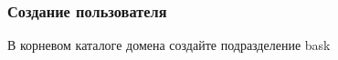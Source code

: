 \documentclass[a4paper, 12pt]{report}
\begin{document}
	\begin{figure}[h]
		\label{fig:image}
	\end{figure}

	\clearpage
	
	\subsubsection{Создание пользователя}
	
	\begin{figure}[h]
		\label{fig:image}
	\end{figure}

	В корневом каталоге домена создайте подразделение bask
	
\end{document}

